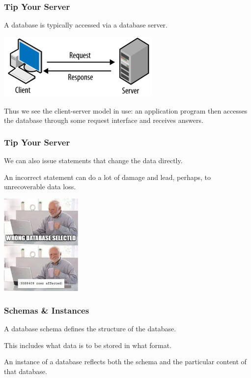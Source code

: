 \begin{frame}
\frametitle{Tip Your Server}

A database is typically accessed via a database server. 

\begin{center}
	\includegraphics[width=0.6\textwidth]{images/client-server.png}
\end{center}

Thus we see the client-server model in use: an application program then accesses the database through some request interface and receives answers. 

\end{frame}



\begin{frame}
\frametitle{Tip Your Server}

We can also issue statements that change the data directly.

An incorrect statement can do a lot of damage and lead, perhaps, to unrecoverable data loss. 

\begin{center}
	\includegraphics[width=0.3\textwidth]{images/wrong-db.jpg}
\end{center}

\end{frame}



\begin{frame}
\frametitle{Schemas \& Instances}

A database \alert{schema} defines the structure of the database. 

This includes what data is  to be stored in what format. 

An instance of a database reflects both the schema and the particular content of that database.

\end{frame}



